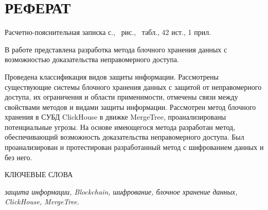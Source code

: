 \section*{РЕФЕРАТ}

Расчетно-пояснительная записка \pageref{LastPage} с., \totalfigures\ рис., \totaltables\ табл., 42 ист., 1 прил.

В работе представлена разработка метода блочного хранения данных с возможностью доказательства неправомерного доступа.

Проведена классификация видов защиты информации. Рассмотрены существующие системы блочного хранения данных с защитой от неправомерного доступа, их ограничения и области применимости, отмечены связи между свойствами методов и видами защиты информации. Рассмотрен метод блочного хранения в СУБД ClickHouse в движке MergeTree, проанализированы потенциальные угрозы. На основе имеющегося метода разработан метод, обеспечивающий возможность доказательства неправомерного доступа. Был проанализирован и протестирован разработанный метод с шифрованием данных и без него.

КЛЮЧЕВЫЕ СЛОВА

\textit{защита информации, Blockchain, шифрование, блочное хранение данных, ClickHouse, MergeTree.}

\pagebreak